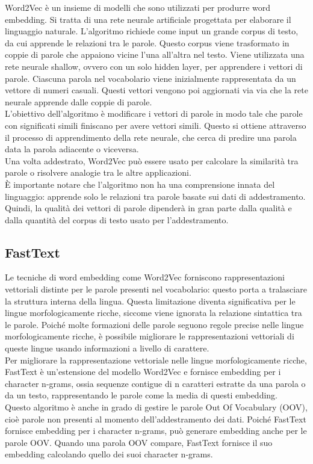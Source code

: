 \documentclass[12pt,a4paper,openright,twoside]{report}
\begin{document}
Word2Vec \cite{word2vec} è un insieme di modelli che sono utilizzati per produrre word embedding. Si tratta di una rete neurale artificiale progettata per elaborare il linguaggio naturale.
L'algoritmo richiede come input un grande corpus di testo, da cui apprende le relazioni tra le parole. Questo corpus viene trasformato in coppie di parole che appaiono vicine l’una all’altra nel testo. Viene utilizzata una rete neurale shallow, ovvero con un solo hidden layer, per apprendere i vettori di parole. Ciascuna parola nel vocabolario viene inizialmente rappresentata da un vettore di numeri casuali. Questi vettori vengono poi aggiornati via via che la rete neurale apprende dalle coppie di parole.\\
L’obiettivo dell’algoritmo è modificare i vettori di parole in modo tale che parole con significati simili finiscano per avere vettori simili. Questo si ottiene attraverso il processo di apprendimento della rete neurale, che cerca di predire una parola data la parola adiacente o viceversa.\\
Una volta addestrato, Word2Vec può essere usato per calcolare la similarità tra parole o risolvere analogie tra le altre applicazioni.\\
È importante notare che l'algoritmo non ha una comprensione innata del linguaggio: apprende solo le relazioni tra parole basate sui dati di addestramento. Quindi, la qualità dei vettori di parole dipenderà in gran parte dalla qualità e dalla quantità del corpus di testo usato per l’addestramento.

\subsection{FastText}

Le tecniche di word embedding come Word2Vec forniscono rappresentazioni vettoriali distinte per le parole presenti nel vocabolario: questo porta a tralasciare la struttura interna della lingua. Questa limitazione diventa significativa per le lingue morfologicamente ricche, siccome viene ignorata la relazione sintattica tra le parole. Poiché molte formazioni delle parole seguono regole precise nelle lingue morfologicamente ricche, è possibile migliorare le rappresentazioni vettoriali di queste lingue usando informazioni a livello di carattere.\\
Per migliorare la rappresentazione vettoriale nelle lingue morfologicamente ricche, FastText \cite{fastText} è un'estensione del modello Word2Vec e fornisce embedding per i character n-grams, ossia sequenze contigue di n caratteri estratte da una parola o da un testo, rappresentando le parole come la media di questi embedding.\\
Questo algoritmo è anche in grado di gestire le parole Out Of Vocabulary (OOV), cioè parole non presenti al momento dell'addestramento dei dati. Poiché FastText fornisce embedding per i character n-grams, può generare embedding anche per le parole OOV. Quando una parola OOV compare, FastText fornisce il suo embedding calcolando quello dei suoi character n-grams.
\end{document}
